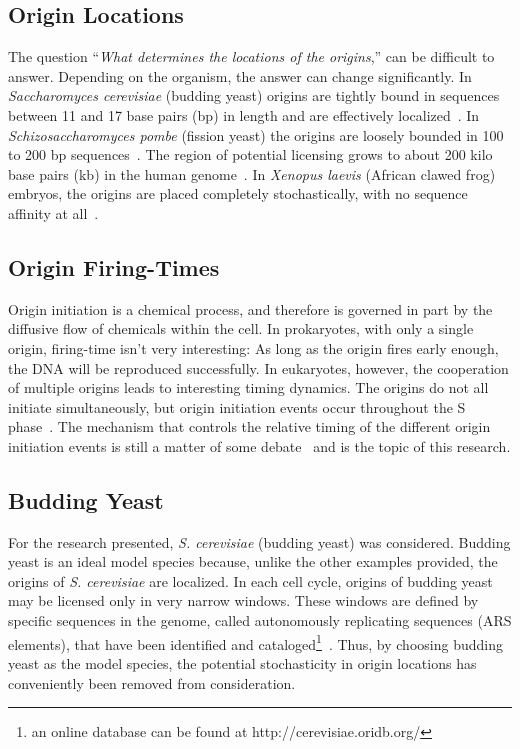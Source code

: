 	
		\subsection{Origin Locations}
		\label{subsec:OriginLocations}
		
		The question ``\emph{What determines the locations of the origins},'' can be difficult to answer.
		Depending on the organism, the answer can change significantly.
		In \emph{Saccharomyces cerevisiae} (budding yeast) origins are tightly bound in sequences between 11 and 17 base pairs (bp) in length and are effectively localized~\cite{ScottsPaper}.
		In \emph{Schizosaccharomyces pombe} (fission yeast) the origins are loosely bounded in 100 to 200 bp sequences~\cite{OriginsReview}.
		The region of potential licensing grows to about 200 kilo base pairs (kb) in the human genome~\cite{HumanGenome}.
		In \emph{Xenopus laevis} (African clawed frog) embryos, the origins are placed completely stochastically, with no sequence affinity at all~\cite{FrogEmbryo}.
		
		
		\subsection{Origin Firing-Times}
		\label{subsec:OriginTimes}
		
		Origin initiation is a chemical process, and therefore is governed in part by the diffusive flow of chemicals within the cell.
		In prokaryotes, with only a single origin, firing-time isn't very interesting:
		As long as the origin fires early enough, the DNA will be reproduced successfully.
		In eukaryotes, however, the cooperation of multiple origins leads to interesting timing dynamics.
		The origins do not all initiate simultaneously, but origin initiation events occur throughout the S phase~\cite{DNAInitiation}.
		The mechanism that controls the relative timing of the different origin initiation events is still a matter of some debate~\cite{ScottsPaper,Bechhoefer2012374,deMouraModel1,deMouraModel2} and is the topic of this research.
		
		
		\subsection{Budding Yeast}
		\label{subsec:BuddingYeast}
		
		For the research presented, \emph{S. cerevisiae} (budding yeast) was considered.
		Budding yeast is an ideal model species because, unlike the other examples provided, the origins of \emph{S. cerevisiae} are localized.
		In each cell cycle, origins of budding yeast may be licensed only in very narrow windows.
		These windows are defined by specific sequences in the genome, called autonomously replicating sequences (ARS elements), that have been identified and cataloged\footnote{an online database can be found at http://cerevisiae.oridb.org/}~\cite{OriDB}.
		Thus, by choosing budding yeast as the model species, the potential stochasticity in origin locations has conveniently been removed from consideration.
		
